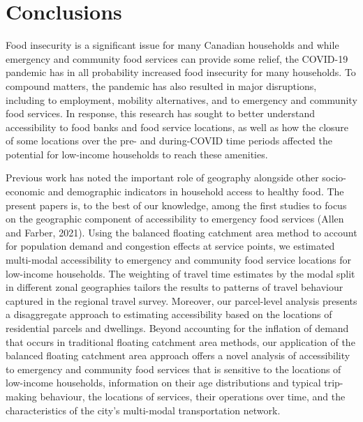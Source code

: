 \documentclass[]{elsarticle} %
\begin{document}
\hypertarget{conclusions}{%
\section{Conclusions}\label{conclusions}}

Food insecurity is a significant issue for many Canadian households and
while emergency and community food services can provide some relief, the
COVID-19 pandemic has in all probability increased food insecurity for
many households. To compound matters, the pandemic has also resulted in
major disruptions, including to employment, mobility alternatives, and
to emergency and community food services. In response, this research has
sought to better understand accessibility to food banks and food service
locations, as well as how the closure of some locations over the pre-
and during-COVID time periods affected the potential for low-income
households to reach these amenities.

Previous work has noted the important role of geography alongside other
socio-economic and demographic indicators in household access to healthy
food. The present papers is, to the best of our knowledge, among the
first studies to focus on the geographic component of accessibility to
emergency food services (Allen and Farber, 2021). Using the balanced
floating catchment area method to account for population demand and
congestion effects at service points, we estimated multi-modal
accessibility to emergency and community food service locations for
low-income households. The weighting of travel time estimates by the
modal split in different zonal geographies tailors the results to
patterns of travel behaviour captured in the regional travel survey.
Moreover, our parcel-level analysis presents a disaggregate approach to
estimating accessibility based on the locations of residential parcels
and dwellings. Beyond accounting for the inflation of demand that occurs
in traditional floating catchment area methods, our application of the
balanced floating catchment area approach offers a novel analysis of
accessibility to emergency and community food services that is sensitive
to the locations of low-income households, information on their age
distributions and typical trip-making behaviour, the locations of
services, their operations over time, and the characteristics of the
city's multi-modal transportation network.
\end{document}
